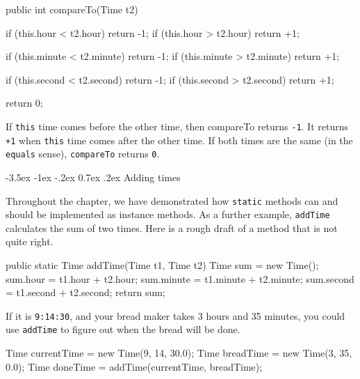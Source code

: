 \documentclass[12pt]{book}
\makeatletter
\renewcommand{\section}{\@startsection {section}{1}{\z@}%
    {-3.5ex \@plus -1ex \@minus -.2ex}%
    {0.7ex \@plus.2ex}%
    {\normalfont\Large\bfseries}}
\theoremstyle{exercise}
\newcommand{\java}[1]{\lstinline{#1}} %
\makeatother
\begin{document}
\begin{code}
    public int compareTo(Time t2) {
        if (this.hour < t2.hour) return -1;
        if (this.hour > t2.hour) return +1;
        
        if (this.minute < t2.minute) return -1;
        if (this.minute > t2.minute) return +1;
        
        if (this.second < t2.second) return -1;
        if (this.second > t2.second) return +1;
        
        return 0;
    }
\end{code}

If \java{this} time comes before the other time, then compareTo returns \java{-1}.
It returns \java{+1} when \java{this} time comes after the other time.
If both times are the same (in the \java{equals} sense), \java{compareTo} returns \java{0}.


\section{Adding times}

Throughout the chapter, we have demonstrated how \java{static} methods can and should be implemented as instance methods.
As a further example, \java{addTime} calculates the sum of two times.
Here is a rough draft of a method that is not quite right.

\begin{code}
    public static Time addTime(Time t1, Time t2) {
        Time sum = new Time();
        sum.hour = t1.hour + t2.hour;
        sum.minute = t1.minute + t2.minute;
        sum.second = t1.second + t2.second;
        return sum;
    }
\end{code}


If it is {\tt 9:14:30}, and your bread maker takes 3 hours and 35 minutes, you could use \java{addTime} to figure out when the bread will be done.

\begin{code}
    Time currentTime = new Time(9, 14, 30.0);
    Time breadTime = new Time(3, 35, 0.0);
    Time doneTime = addTime(currentTime, breadTime);
\end{code}
\end{document}
